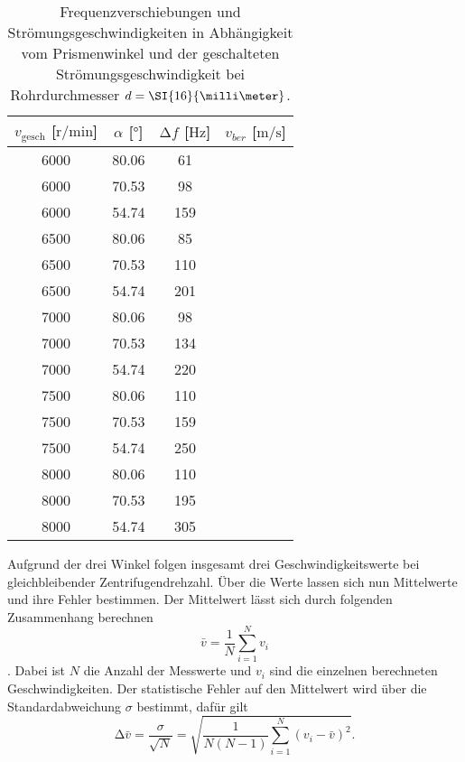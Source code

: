 \begin{table}
    \centering
    \caption{Frequenzverschiebungen und Strömungsgeschwindigkeiten in Abhängigkeit vom Prismenwinkel und der geschalteten Strömungsgeschwindigkeit bei Rohrdurchmesser $\protect d = \SI{16}{\milli\meter}$.}
    \label{tab:6}
    \begin{tabular}{c c c c}
        \toprule
        $v_{\text{gesch}}$ [$\si{{\text{r}}\per\minute}$]  & $\alpha$ [$\si{\degree}$]  & $\increment f$ [$\si{\hertz}$] & $v_{ber}$ [$\si{\meter\per\second}$]\\
        \midrule
        6000    &   80.06    & 61   & ~ \\ 
        6000    &   70.53    & 98   & ~ \\ 
        6000    &   54.74    & 159   & ~ \\ 
        \midrule
        6500    &   80.06   & 85    & ~ \\ 
        6500    &   70.53   & 110    & ~ \\ 
        6500    &   54.74   & 201    & ~ \\ 
        \midrule
        7000    &   80.06   & 98    & ~ \\ 
        7000    &   70.53   & 134    & ~ \\ 
        7000    &   54.74   & 220    & ~ \\ 
        \midrule
        7500    &   80.06   & 110    & ~ \\ 
        7500    &   70.53   & 159    & ~ \\ 
        7500    &   54.74   & 250   & ~ \\ 
        \midrule
        8000    &   80.06   & 110    & ~ \\ 
        8000    &   70.53   & 195    & ~ \\ 
        8000    &   54.74   & 305   & ~ \\ 
        \bottomrule
    \end{tabular}
\end{table}   
                            
Aufgrund der drei Winkel folgen insgesamt drei Geschwindigkeitswerte bei gleichbleibender Zentrifugendrehzahl. Über die Werte lassen sich nun Mittelwerte und ihre Fehler bestimmen.
Der Mittelwert lässt sich durch folgenden Zusammenhang berechnen
\begin{equation}
    \label{eqn:mittel}
\bar{v} = \frac{1}{N} \sum_{i=1}^{N} v_{i}
\end{equation}.
Dabei ist $N$ die Anzahl der Messwerte und $v_{i}$ sind die einzelnen berechneten Geschwindigkeiten.
Der statistische Fehler auf den Mittelwert wird über die Standardabweichung $\sigma$ bestimmt, dafür gilt
\begin{equation}
    \label{eqn:sem}
\increment \bar{v} = \frac{\sigma}{\sqrt{N}} = \sqrt{\frac{1}{N(N-1)} \sum_{i=1}^{N} (v_{i} - \bar{v})^{2}}.
\end{equation}            
                           
